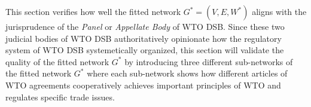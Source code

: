 This section verifies
how well the fitted network $G^* = (V, E, W^*)$
aligns with the jurisprudence of the \textit{Panel} or \textit{Appellate Body} of WTO DSB.
Since these two judicial bodies of WTO DSB authoritatively
opinionate how the regulatory system of WTO DSB systemetically organized,
this section will validate the quality of the fitted network $G^*$ by 
introducing three different sub-networks of 
the fitted network $G^*$ where each sub-network shows how different articles of WTO agreements 
cooperatively achieves important principles of WTO and regulates specific trade issues. 


